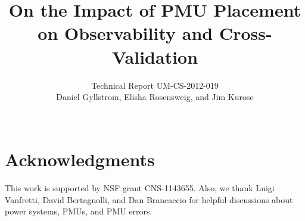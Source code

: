 \documentclass{acm-alternate}
\newcommand{\doctitle}{On the Impact of PMU Placement on Observability and Cross-Validation}
\begin{document}
\title{\doctitle}

\author{
\alignauthor Technical Report UM-CS-2012-019 \\
Daniel Gyllstrom, Elisha Rosensweig, and Jim Kurose \\
  \\ 
}

\maketitle





%



%



 


%



%



\section{Acknowledgments}
This work is supported by NSF grant CNS-1143655. Also, we thank Luigi Vanfretti, David Bertagnolli, and  Dan Brancaccio for helpful discussions about power systems, PMUs, and PMU errors.  



\end{document}
